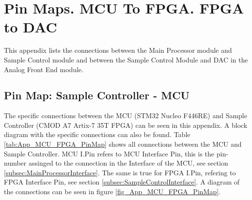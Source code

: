 \chapter{Pin Maps. MCU To FPGA. FPGA to DAC} \label{App:PinMaps}

This appendix lists the connections between the Main Processor module and Sample Control module and between the Sample Control Module and DAC in the Analog Front End module.

\section{Pin Map: Sample Controller - MCU} \label{App:PinMap_MCU_FPGA}

The specific connections between the MCU (STM32 Nucleo F446RE) and Sample Controller (CMOD A7 Artix-7 35T FPGA) can be seen in this appendix. A block diagram with the specific
connections can also be found. Table \ref{tab:App_MCU_FPGA_PinMap} shows all connections between the MCU and Sample Controller. MCU I.Pin refers to MCU Interface Pin, this is the
pin-number assinged to the connection in the Interface of the MCU, see section \ref{subsec:MainProcessorInterface}. The same is true for FPGA I.Pin, refering to FPGA Interface Pin,
see section \ref{subsec:SampleControlInterface}. A diagram of the connections can be seen in figure \ref{fig_App_MCU_FPGA_PinMap}.

